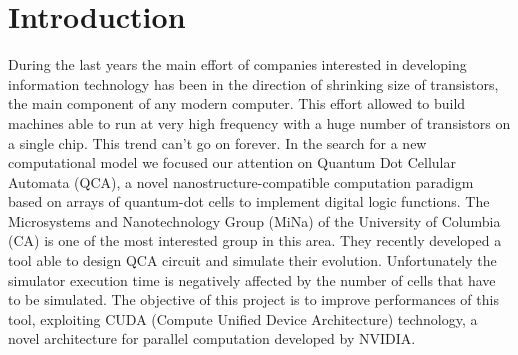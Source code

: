 \chapter{Introduction}\label{chap:intro}
During the last years the main effort of companies interested in developing information technology has been in the direction of shrinking size of transistors, the main component of any modern computer. This effort allowed to build machines able to run at very high frequency with a huge number of transistors on a single chip.  This trend can't go on forever. In the search for a new computational model we focused our attention on Quantum Dot Cellular Automata (QCA), a novel nanostructure-compatible computation paradigm based on arrays of quantum-dot cells to implement digital logic functions.\newline
The  Microsystems and Nanotechnology Group (MiNa) of the University of Columbia (CA) is one of the most interested group in this area. They recently developed a tool able to design QCA circuit and simulate their evolution. Unfortunately the simulator execution time is negatively affected by the number of cells that have to be simulated.
The objective of this project is to improve performances of this tool, exploiting CUDA (Compute Unified Device Architecture) technology, a novel architecture for parallel computation developed by NVIDIA.